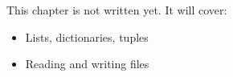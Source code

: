 \label{ch:py2}
\begin{keyidea}
This chapter is not written yet. It will cover:
\begin{itemize}[nosep]
  \item Lists, dictionaries, tuples
  \item Reading and writing files
\end{itemize}
\end{keyidea}
